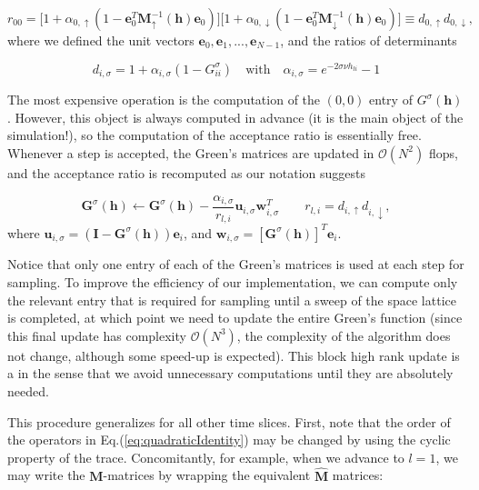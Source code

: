 \begin{equation}
r_{0 0} = \bigg[ 1 + \alpha_{0, \uparrow} ( 1 - \bm e_0^T \bm M_\uparrow^{-1} ( \bm h ) \bm e_0 ) \bigg] \bigg[ 1 + \alpha_{0, \downarrow} ( 1 - \bm e_0^T \bm M_\downarrow^{-1} ( \bm h ) \bm e_0 ) \bigg] \equiv d_{0, \uparrow} d_{0, \downarrow} ,
\end{equation}
where we defined the unit vectors $\bm e_0, \bm e_1, ..., \bm e_{N-1}$, and the ratios of determinants

\begin{equation*}
d_{i, \sigma} = 1 + \alpha_{i, \sigma} ( 1 - G^\sigma_{i i} ) \quad \text{with} \quad \alpha_{i, \sigma} = e^{-2 \sigma \nu h_{l i}} - 1
\end{equation*}

The most expensive operation is the computation of the $(0, 0)$ entry of $G^\sigma (\bm h)$.
However, this object is always computed in advance (it is the main object of the simulation!), so the computation of the acceptance ratio is essentially free.
Whenever a step is accepted, the Green's matrices are updated in $\mathcal{O}(N^2)$ flops, and the acceptance ratio is recomputed as our notation suggests

\begin{equation}
\bm G^\sigma ( \bm h ) \leftarrow \bm G^\sigma ( \bm h ) - \frac{\alpha_{i, \sigma}}{r_{l, i}} \bm u_{i, \sigma} \bm w_{i, \sigma}^T \quad \quad r_{l,i} = d_{i, \uparrow} d_{i, \downarrow} ,
\end{equation}
where $\bm u_{i, \sigma} = ( \bm I - \bm G^\sigma ( \bm h ) ) \bm e_i$, and $\bm w_{i, \sigma} = [ \bm G^\sigma (\bm h) ]^T \bm e_i$.

Notice that only one entry of each of the Green's matrices is used at each step for sampling.
To improve the efficiency of our implementation, we can compute only the relevant entry that is required for sampling until a sweep of the space lattice is completed, at which point we need to update the entire Green's function (since this final update has complexity $\mathcal{O}(N^3)$, the complexity of the algorithm does not change, although some speed-up is expected).
This block high rank update is a   in the sense that we avoid unnecessary computations until they are absolutely needed.

This procedure generalizes for all other time slices.
First, note that the order of the operators in Eq.(\ref{eq:quadraticIdentity}) may be changed by using the cyclic property of the trace.
Concomitantly, for example, when we advance to $l = 1$, we may write the $\bm M$-matrices by wrapping the equivalent $\widehat{\bm M}$ matrices:


